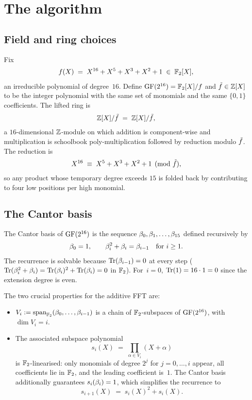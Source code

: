 \section{The algorithm}
\label{sec:algorithm}

\subsection{Field and ring choices}
\label{sec:field-choices}

Fix
\[
  f(X) \;=\; X^{16} + X^{5} + X^{3} + X^{2} + 1 \;\in\; \mathbb{F}_2[X],
\]
an irreducible polynomial of degree~$16$. Define
$\operatorname{GF}(2^{16}) = \mathbb{F}_2[X]/f$ and $\tilde f \in \mathbb{Z}[X]$ to be the integer
polynomial with the same set of monomials and the same $\{0,1\}$
coefficients. The lifted ring is
\[
  \mathbb{Z}[X]/\tilde f \;=\; \mathbb{Z}[X]/\tilde f,
\]
a $16$-dimensional $\mathbb{Z}$-module on which addition is component-wise and
multiplication is schoolbook poly-multiplication followed by reduction
modulo $\tilde f$. The reduction is
\[
  X^{16} \;\equiv\; X^{5} + X^{3} + X^{2} + 1 \pmod{\tilde f},
\]
so any product whose temporary degree exceeds $15$ is folded back by
contributing to four low positions per high monomial.

\subsection{The Cantor basis}
\label{sec:cantor}

The Cantor basis of $\operatorname{GF}(2^{16})$ is the sequence
$\beta_0, \beta_1, \ldots, \beta_{15}$ defined recursively by
\begin{equation}
  \beta_0 = 1, \qquad \beta_i^2 + \beta_i = \beta_{i-1} \quad \text{for } i \ge 1.
  \label{eq:cantor-recurrence}
\end{equation}
The recurrence is solvable because $\operatorname{Tr}(\beta_{i-1}) = 0$ at every step
($\operatorname{Tr}(\beta_i^2 + \beta_i) = \operatorname{Tr}(\beta_i)^2 + \operatorname{Tr}(\beta_i) = 0$ in $\mathbb{F}_2$).
For~$i = 0$, $\operatorname{Tr}(1) = 16 \cdot 1 = 0$ since the extension degree is
even.

The two crucial properties for the additive FFT are:
\begin{itemize}
  \item $V_i := \mathrm{span}_{\mathbb{F}_2}(\beta_0, \ldots, \beta_{i-1})$ is a
    chain of $\mathbb{F}_2$-subspaces of $\operatorname{GF}(2^{16})$, with
    $\dim V_i = i$.
  \item The associated subspace polynomial
    \[
      s_i(X) \;=\; \prod_{\alpha \in V_i} (X + \alpha)
    \]
    is $\mathbb{F}_2$-linearised: only monomials of degree $2^j$ for
    $j = 0, \ldots, i$ appear, all coefficients lie in $\mathbb{F}_2$, and
    the leading coefficient is~$1$. The Cantor basis additionally
    guarantees $s_i(\beta_i) = 1$, which simplifies the
    recurrence to
    \begin{equation}
      s_{i+1}(X) \;=\; s_i(X)^2 + s_i(X).
      \label{eq:cantor-subspace-recurrence}
    \end{equation}
\end{itemize}

